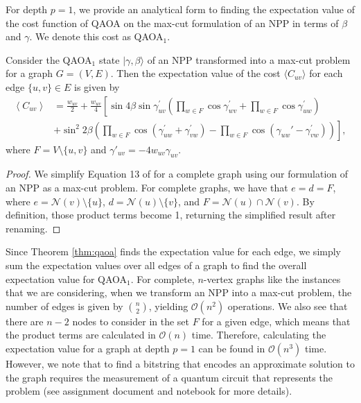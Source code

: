     For depth $p=1$, we provide an analytical form to finding the expectation value of the cost function of QAOA on the max-cut formulation of an NPP in terms of $\beta$ and $\gamma$. We denote this cost as QAOA$_1$.
    \begin{widetext}
        \begin{theorem} \label{thm:qaoa}
            Consider the QAOA$_1$ state $|\gamma,\beta\rangle$ of an NPP transformed into a max-cut problem for a graph $G=(V,E)$. Then the expectation value of the cost $\langle C_{uv}\rangle$ for each edge $\{u,v\}\in E$ is given by
            \begin{align*}
                \left\langle C_{u v}\right\rangle & =\frac{w_{u v}}{2}+\frac{w_{u v}}{4}\left[\sin 4 \beta \sin \gamma_{u v}^{\prime}\left(\prod_{w \in F} \cos \gamma_{w v}^{\prime}+\prod_{w \in F} \cos \gamma_{u w}^{\prime}\right)\right. \\ 
                & \left.+\sin ^2 2 \beta \left(\prod_{w \in F} \cos \left(\gamma_{u w}^{\prime}+\gamma_{v w}^{\prime}\right)-\prod_{w \in F} \cos \left(\gamma_{u w}'-\gamma_{v w}^{\prime}\right)\right)\right],
            \end{align*}
            where $F = V\setminus\{u,v\}$ and $\gamma'_{uv} = -4w_{uv}\gamma_{uv}$.
        \end{theorem}
    \end{widetext}
        \begin{proof}
            We simplify Equation 13 of \cite{vijendran2023expressive} for a complete graph using our formulation of an NPP as a max-cut problem. For complete graphs, we have that $e=d=F$, where $e=\mathcal{N}(v)\setminus\{u\}$, $d=\mathcal{N}(u)\setminus\{v\}$, and $F=\mathcal{N}(u)\cap\mathcal{N}(v)$. By definition, those product terms become 1, returning the simplified result after renaming.
        \end{proof}
        Since Theorem \ref{thm:qaoa} finds the expectation value for each edge, we simply sum the expectation values over all edges of a graph to find the overall expectation value for QAOA$_1$. For complete, $n$-vertex graphs like the instances that we are considering, when we transform an NPP into a max-cut problem, the number of edges is given by $\binom{n}{2}$, yielding $\mathcal{O}(n^2)$ operations. We also see that there are $n-2$ nodes to consider in the set $F$ for a given edge, which means that the product terms are calculated in $\mathcal{O}(n)$ time. Therefore, calculating the expectation value for a graph at depth $p=1$ can be found in $\mathcal{O}(n^3)$ time. However, we note that to find a bitstring that encodes an approximate solution to the graph requires the measurement of a quantum circuit that represents the problem (see {\color{red} assignment document and notebook} for more details).


